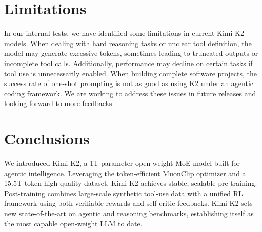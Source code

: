 \section{Limitations}
In our internal tests, we have identified some limitations in current Kimi K2 models. When dealing with hard reasoning tasks or unclear tool definition, the model may generate excessive tokens, sometimes leading to truncated outputs or incomplete tool calls. Additionally, performance may decline on certain tasks if tool use is unnecessarily enabled. When building complete software projects, the success rate of one-shot prompting is not as good as using K2 under an agentic coding framework. We are working to address these issues in future releases and looking forward to more feedbacks.

\section{Conclusions}

We introduced Kimi K2, a 1T-parameter open-weight MoE model built for agentic intelligence. Leveraging the token-efficient MuonClip optimizer and a 15.5T-token high-quality dataset, Kimi K2 achieves stable, scalable pre-training. Post-training combines large-scale synthetic tool-use data with a unified RL framework using both verifiable rewards and self-critic feedbacks. Kimi K2 sets new state-of-the-art on agentic and reasoning benchmarks, establishing itself as the most capable open-weight LLM to date.

